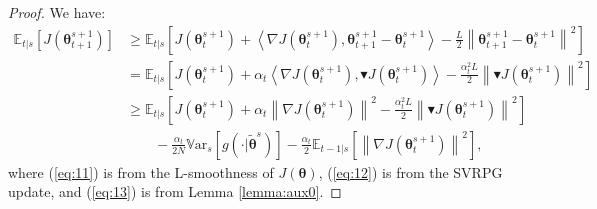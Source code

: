 \documentclass{article}
\theoremstyle{remark}
\theoremstyle{definition}
\newcommand{\norm}[2][\infty]{\left\|#2\right\|_{#1}}
\newcommand{\dotprod}[2]{\left\langle#1,#2\right\rangle}
\newcommand{\vtheta}{\boldsymbol{\theta}}
\newcommand{\gradJ}[1]{\nabla J(#1)}
\newcommand{\Ets}[2][t]{\mathbb{E}_{#1\vert s}\left[#2\right]}
\newcommand{\Vars}[1]{{\mathbb{V}\text{ar}}_{s}\left[#1\right]}
\newcommand{\gradBlack}[1]{\blacktriangledown J(#1)}
\begin{document}
\begin{proof}
	We have:
	\begin{align}
	\Ets{J(\vtheta_{t+1}^{s+1})} 
	&\geq \Ets{J(\vtheta_t^{s+1})+\dotprod{\gradJ{\vtheta_t^{s+1}}}{\vtheta_{t+1}^{s+1}-\vtheta_t^{s+1}} - \frac{L}{2}\norm[]{\vtheta_{t+1}^{s+1}-\vtheta_t^{s+1}}^2} \label{eq:11}\\
	&= \Ets{J(\vtheta_t^{s+1})+\alpha_t\dotprod{\gradJ{\vtheta_t^{s+1}}}{\gradBlack{\vtheta_t^{s+1}}} - \frac{\alpha_t^2L}{2}\norm[]{\gradBlack{\vtheta_t^{s+1}}}^2} \label{eq:12}\\
	&\geq
	\Ets{J(\vtheta_t^{s+1})+\alpha_t\norm[]{\gradJ{\vtheta_t^{s+1}}}^2 - \frac{\alpha_t^2L}{2}\norm[]{\gradBlack{\vtheta_t^{s+1}}}^2} \nonumber\\
	&\qquad-
	\frac{\alpha_t}{2N}\Vars{g(\cdot\vert\tilde{\vtheta}^s)} -\frac{\alpha_t}{2}\Ets[t-1]{\norm[]{\gradJ{\vtheta_t^{s+1}}}^2}, \label{eq:13}
\end{align}
where (\ref{eq:11}) is from the L-smoothness of $J(\vtheta)$, (\ref{eq:12}) is from the SVRPG update, and (\ref{eq:13}) is from Lemma \ref{lemma:aux0}.


\end{proof}
\end{document}
